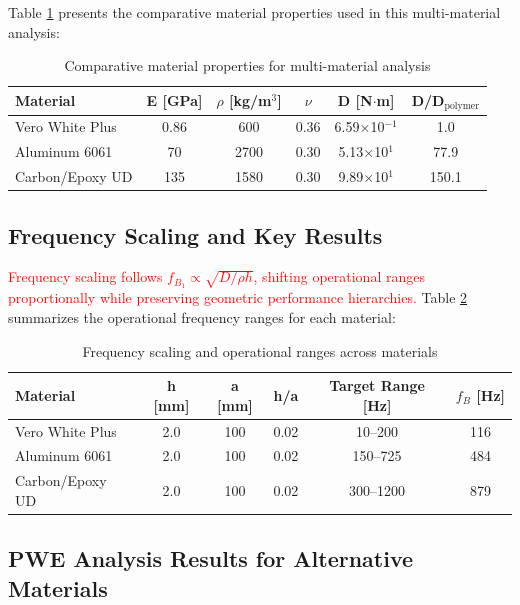 \documentclass[review,numbers,sort&compress]{elsarticle}
\begin{document}
Table \ref{tab:material_properties_comparison} presents the comparative material properties used in this multi-material analysis:

\begin{table}[!htb]
\centering
\caption{Comparative material properties for multi-material analysis}
\label{tab:material_properties_comparison}
\small
\begin{tabular}{lccccc}
\hline
Material & E [GPa] & $\rho$ [kg/m$^3$] & $\nu$ & D [N$\cdot$m] & D/D$_{\text{polymer}}$ \\
\hline
Vero White Plus & 0.86 & 600 & 0.36 & 6.59$\times$10$^{-1}$ & 1.0 \\
Aluminum 6061 & 70 & 2700 & 0.30 & 5.13$\times$10$^{1}$ & 77.9 \\
Carbon/Epoxy UD & 135 & 1580 & 0.30 & 9.89$\times$10$^{1}$ & 150.1 \\
\hline
\end{tabular}
\end{table}

\subsection{Frequency Scaling and Key Results}

\textcolor{red}{Frequency scaling follows $f_{B_1} \propto \sqrt{D/\rho h}$, shifting operational ranges proportionally while preserving geometric performance hierarchies.} Table \ref{tab:frequency_scaling} summarizes the operational frequency ranges for each material:

\begin{table}[!htb]
\centering
\caption{Frequency scaling and operational ranges across materials}
\label{tab:frequency_scaling}
\small
\begin{tabular}{lccccc}
\hline
Material & h [mm] & a [mm] & h/a & Target Range [Hz] & $f_B$ [Hz] \\
\hline
Vero White Plus & 2.0 & 100 & 0.02 & 10--200 & 116 \\
Aluminum 6061 & 2.0 & 100 & 0.02 & 150--725 & 484 \\
Carbon/Epoxy UD & 2.0 & 100 & 0.02 & 300--1200 & 879 \\
\hline
\end{tabular}
\end{table}

\subsection{PWE Analysis Results for Alternative Materials}
\end{document}
